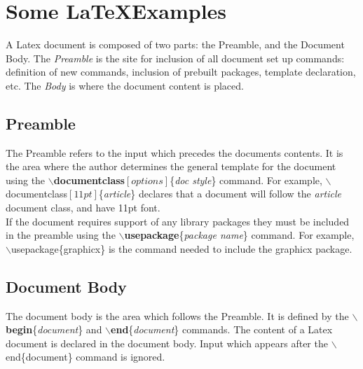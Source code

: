 \section{Some \LaTeX Examples}

A Latex document is composed of two parts: the Preamble, and the Document Body.  The \textit{Preamble} is the site for inclusion of all document set up commands: definition of new commands, inclusion of pre\-built packages, template declaration, etc.  The \textit{Body} is where the document content is placed.

\subsection{Preamble}
 The Preamble refers to the input which precedes the documents contents.  It is the area where the author determines the general template for the document using the \textbf{$\backslash$documentclass}$[options]$\{\textit{doc style}\} command.  For example,
 $\backslash$documentclass$[11pt]$\{\textit{article}\} declares that a document will follow the \textit{article} document class, and have 11pt font.
 \newline\\
 If the document requires support of any library packages they must be included in the preamble using the \textbf{$\backslash$usepackage}\{\textit{package name}\} command. For example, $\backslash$usepackage\{graphicx\} is the command needed to include the graphicx package.

\subsection{Document Body}
The document body is the area which follows the Preamble. It is defined by the \textbf{$\backslash$begin}\{\textit{document}\} and \textbf{$\backslash$end}\{\textit{document}\} commands.  The content of a Latex document is declared in the document body.  Input which appears after the $\backslash$end\{document\} command is ignored.

